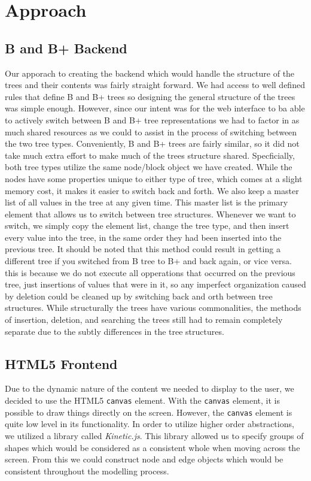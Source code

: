 \section{Approach}

\subsection{B and B+ Backend}
Our apporach to creating the backend which would handle the structure
of the trees and their contents was fairly straight forward.  We had
access to well defined rules that define B and B+ trees so designing
the general structure of the trees was simple enough.  However, since
our intent was for the web interface to ba able to actively switch
between B and B+ tree representations we had to factor in as much
shared resources as we could to assist in the process of switching
between the two tree types.  Conveniently, B and B+ trees are fairly
similar, so it did not take much extra effort to make much of the
trees structure shared.  Specficially, both tree types utilize the
same node/block object we have created.  While the nodes have some
properties unique to either type of tree, which comes at a slight
memory cost, it makes it easier to switch back and forth.  We also
keep a master list of all values in the tree at any given time.  This
master list is the primary element that allows us to switch between
tree structures.  Whenever we want to switch, we simply copy the
element list, change the tree type, and then insert every value into
the tree, in the same order they had been inserted into the previous
tree.  It should be noted that this method could result in getting a
different tree if you switched from B tree to B+ and back again, or
vice versa.  this is because we do not execute all opperations that
occurred on the previous tree, just insertions of values that were in
it, so any imperfect organization caused by deletion could be cleaned
up by switching back and orth between tree structures.  While
structurally the trees have various commonalities, the methods of
insertion, deletion, and searching the trees still had to remain
completely separate due to the subtly differences in the tree
structures.

\subsection{HTML5 Frontend}
Due to the dynamic nature of the content we needed to display to the
user, we decided to use the HTML5 \texttt{canvas} element. With the
\texttt{canvas} element, it is possible to draw things directly on the
screen. However, the \texttt{canvas} element is quite low level in
its functionality. In order to utilize higher order abstractions, we
utilized a library called \textit{Kinetic.js}. This library allowed us
to specify groups of shapes which would be considered as a consistent
whole when moving across the screen. From this we could construct node
and edge objects which would be consistent throughout the modelling
process.

